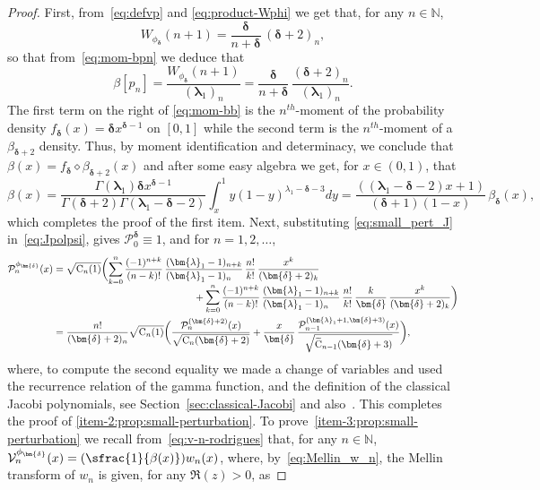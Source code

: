 \documentclass[10pt]{amsart}
\newcommand{\Psfrac}[2]{(\sfrac{#1}{#2})}
\theoremstyle{plain}
\theoremstyle{definition}
\newcommand{\N}{\mathbb{N}}
\renewcommand{\P}{\mathcal{P}}
\newcommand{\V}{\mathcal{V}}
\newcommand{\C}{{\mathrm{C}}}
\newcommand{\lam}{{\bm{\lambda}_1}}
\newcommand{\mm}{{\bm{\delta}}}
\newcommand{\gab}[1][\lam,\mo]{{\beta_{#1}}}
\let\mo\mu
\let\bpsi\beta
\begin{document}
\begin{proof}
First, from~\eqref{eq:defvp} and \eqref{eq:product-Wphi} we get that, for any $n \in \N$,
\begin{equation}
\label{eq:small_pert_J}
W_{\phi_{\mm}}(n+1) = \frac{\mm}{n+\mm}\, (\mm+2)_n,\end{equation}
so that from~\eqref{eq:mom-bpn} we deduce that
\begin{equation}
\label{eq:mom-bb}
\bpsi [p_n] = \frac{W_{\phi_{\mm}}(n+1)}{(\lam)_n} = \frac{\mm}{n+\mm}\, \frac{(\mm+2)_n}{(\lam)_n}.
\end{equation}
The first term on the right of \eqref{eq:mom-bb} is the $n^{th}$-moment of the probability density $f_\mm(x) = \mm x^{\mm-1}$ on $[0,1]$ while the second term is the $n^{th}$-moment of a $\gab[\mm+2]$ density. Thus, by moment identification and determinacy, we conclude that $\bpsi(x) = f_\mm \diamond \gab[\mm+2](x)$ and after some easy algebra we get, for $x \in (0,1)$, that
\begin{equation*}
\beta(x) = \frac{\Gamma(\lam)\mm x^{\mm-1}}{\Gamma(\mm+2)\Gamma(\lam-\mm-2)} \int_x^1 y (1-y)^{\lambda_1 - \mm - 3} dy
= \frac{((\lam - \mm - 2)x+1)}{(\mm+1)(1-x)}\, \gab[\mm](x),
\end{equation*}
which completes the proof of the first item. Next, substituting \eqref{eq:small_pert_J} in~\eqref{eq:Jpolpsi}, gives $\P_0^{\mm} \equiv 1$, and for $n = 1,2,\ldots$,
\begin{align*}
\P_n^{\phi_\mm}(x) &= \sqrt{\C_n(1)}\biggl( \sum_{k=0}^n \frac{(-1)^{n+k}}{(n-k)!}\, \frac{(\lam-1)_{n+k}}{(\lam-1)_{n\phantom{+k}}}\, \frac{n!}{k!}\, \frac{x^k}{(\mm+2)_k}\\[-5pt]
&\hspace*{5cm}+ \sum_{k=0}^n \frac{(-1)^{n+k}}{(n-k)!}\, \frac{(\lam-1)_{n+k}}{(\lam-1)_{n\phantom{+k}}}\, \frac{n!}{k!}\,\frac{k}{\mm}\, \frac{x^k}{(\mm+2)_k} \biggr) \\
&= \frac{n!}{(\mm+2)_n} \sqrt{\C_n(1)} \biggl( \frac{\P_n^{(\mm+2 )} (x)}{\sqrt{\C_n(\mm+2)}} + \frac{x}{\mm}\, \frac{\P_{n-1}^{(\lam+1,\mm+3)}(x)}{\sqrt{\widetilde{\C}_{n-1}(\mm+3)}} \biggr),
\end{align*}
where, to compute the second equality we made a change of variables and used the recurrence relation of the gamma function, and the definition of the classical Jacobi polynomials, see Section~\ref{sec:classical-Jacobi} and also~\cite{orthogonal_pols}. This completes the proof of \eqref{item-2:prop:small-perturbation}. To prove~\eqref{item-3:prop:small-perturbation} we recall from~\eqref{eq:v-n-rodrigues} that, for any $n \in \N$, $\V_n^{\phi_\mm}(x)= \Psfrac{1}{\beta(x)}w_n(x)$, where, by~\eqref{eq:Mellin_w_n}, the Mellin transform of $w_n$ is given, for any $\Re(z)>0$, as

\end{proof}
\end{document}

